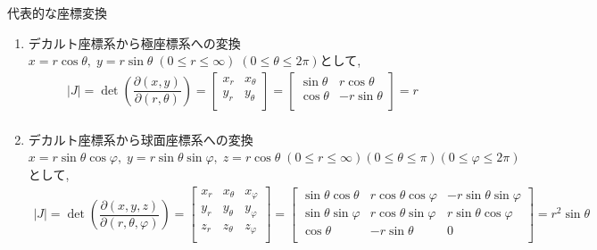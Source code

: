 \documentclass[a4paper]{jsarticle}
\begin{document}
\begin{itembox}[l]{代表的な座標変換}
    \begin{enumerate}[(1)]
        \item デカルト座標系から極座標系への変換\\
              $x=r\cos\theta,\; y=r\sin\theta\;\left(0\leq r\leq \infty\right)\;\left(0\leq \theta \leq 2\pi\right)$として,
              \begin{eqnarray*}
                  |J|=
                  \det\left(\dfrac{\partial\left(x,y\right)}{\partial\left(r,\theta\right)}\right)
                  =
                  \begin{bmatrix}
                      x_r & x_\theta \\
                      y_r & y_\theta \\
                  \end{bmatrix}
                  =
                  \begin{bmatrix}
                      \sin\theta & r\cos\theta  \\
                      \cos\theta & -r\sin\theta \\
                  \end{bmatrix}
                  =r\\
              \end{eqnarray*}
        \item デカルト座標系から球面座標系への変換\\
              $x=r\sin\theta\cos\varphi,\; y=r\sin\theta\sin\varphi,\; z=r\cos\theta\;\left(0\leq r\leq\infty\right)\left(0\leq\theta\leq\pi\right)\left(0\leq\varphi\leq 2\pi\right)$として,
              \begin{eqnarray*}
                  |J|
                  =
                  \det\left(\dfrac{\partial \left(x,y,z\right)}{\partial \left(r,\theta,\varphi\right)}\right)
                  =
                  \begin{bmatrix}
                      x_r & x_\theta & x_\varphi \\
                      y_r & y_\theta & y_\varphi \\
                      z_r & z_\theta & z_\varphi \\
                  \end{bmatrix}
                  =
                  \begin{bmatrix}
                      \sin\theta\cos\theta  & r\cos\theta\cos\varphi & -r\sin\theta\sin\varphi \\
                      \sin\theta\sin\varphi & r\cos\theta\sin\varphi & r\sin\theta\cos\varphi  \\
                      \cos\theta            & -r\sin\theta           & 0                       \\
                  \end{bmatrix}
                  =r^2\sin\theta
              \end{eqnarray*}
    \end{enumerate}
\end{itembox}
\newpage
\end{document}
